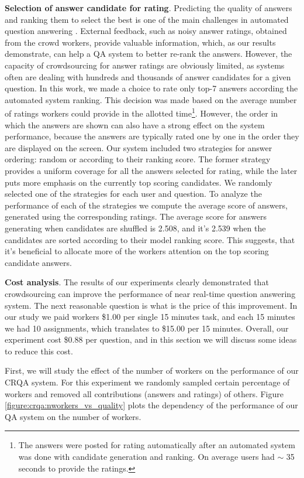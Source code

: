 \textbf{Selection of answer candidate for rating}.
Predicting the quality of answers and ranking them to select the best is one of the main challenges in automated question answering \cite{surdeanu2011learning}.
External feedback, such as noisy answer ratings, obtained from the crowd workers, provide valuable information, which, as our results demonstrate, can help a QA system to better re-rank the answers.
However, the capacity of crowdsourcing for answer ratings are obviously limited, as systems often are dealing with hundreds and thousands of answer candidates for a given question.
In this work, we made a choice to rate only top-7 answers according the automated system ranking.
This decision was made based on the average number of ratings workers could provide in the allotted time\footnote{The answers were posted for rating automatically after an automated system was done with candidate generation and ranking. On average users had $\sim$ 35 seconds to provide the ratings.}.
However, the order in which the answers are shown can also have a strong effect on the system performance, because the answers are typically rated one by one in the order they are displayed on the screen.
Our system included two strategies for answer ordering: random or according to their ranking score.
The former strategy provides a uniform coverage for all the answers selected for rating, while the later puts more emphasis on the currently top scoring candidates.
We randomly selected one of the strategies for each user and question.
To analyze the performance of each of the strategies we compute the average score of answers, generated using the corresponding ratings.
The average score for answers generating when candidates are shuffled is 2.508, and it's 2.539 when the candidates are sorted according to their model ranking score.
This suggests, that it's beneficial to allocate more of the workers attention on the top scoring candidate answers.

\textbf{Cost analysis}.
The results of our experiments clearly demonstrated that crowdsourcing can improve the performance of near real-time question answering system.
The next reasonable question is what is the price of this improvement.
In our study we paid workers \$1.00 per single 15 minutes task, and each 15 minutes we had 10 assignments, which translates to \$15.00 per 15 minutes.
Overall, our experiment cost \$0.88 per question, and in this section we will discuss some ideas to reduce this cost.

First, we will study the effect of the number of workers on the performance of our CRQA system.
For this experiment we randomly sampled certain percentage of workers and removed all contributions (answers and ratings) of others.
Figure \ref{figure:crqa:nworkers_vs_quality} plots the dependency of the performance of our QA system on the number of workers.

